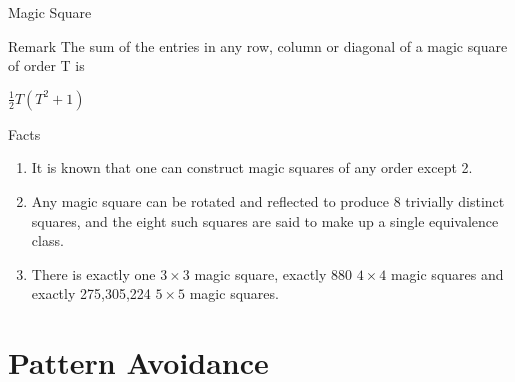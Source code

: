 \documentclass{beamer}
\begin{document}
\begin{frame}{Magic Square}
    \begin{block}{Remark}
        The sum of the entries in any row, column or diagonal of a magic square of order T is \\
        \begin{center}
            $\frac{1}{2} T (T^2 + 1)$
        \end{center}
    \end{block}

    \begin{block}{Facts}
        \begin{enumerate}
        \small
        
            \item It is known that one can construct magic squares of any order except 2.
            
            \item Any magic square can be rotated and reflected to produce 8 trivially distinct squares, and the eight such squares are said to make up a single equivalence class.
            
            \item There is exactly one $3 \times 3$ magic square, exactly 880 $4 \times 4$ magic squares and exactly 275,305,224 $5 \times 5$ magic squares.
    \end{enumerate}
    \end{block}
\end{frame}

\section{Pattern Avoidance}
\end{document}
